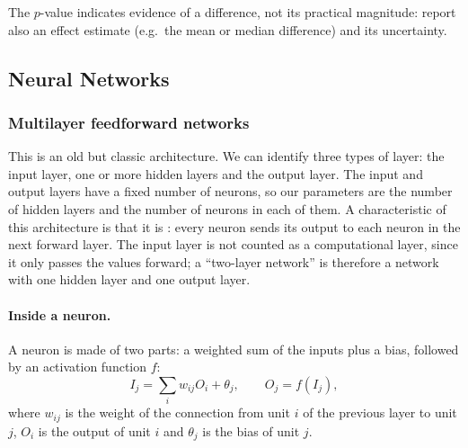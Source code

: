 \begin{remark}
The $p$-value indicates evidence of a difference, not its practical magnitude: report also an effect estimate (e.g.\ the mean or median difference) and its uncertainty.
\end{remark}

\subsection{Neural Networks}

\subsubsection{Multilayer feedforward networks}

This is an old but classic architecture. We can identify three types of layer: the input layer, one or more hidden layers and the output layer. The input and output layers have a fixed number of neurons, so our parameters are the number of hidden layers and the number of neurons in each of them. A characteristic of this architecture is that it is : every neuron sends its output to each neuron in the next forward layer. The input layer is not counted as a computational layer, since it only passes the values forward; a ``two-layer network'' is therefore a network with one hidden layer and one output layer.

\paragraph{Inside a neuron.} A neuron is made of two parts: a weighted sum of the inputs plus a bias, followed by an activation function $f$:
\[
  I_j = \sum_i w_{ij} O_i + \theta_j, \qquad O_j = f(I_j),
\]
where $w_{ij}$ is the weight of the connection from unit $i$ of the previous layer to unit $j$, $O_i$ is the output of unit $i$ and $\theta_j$ is the bias of unit $j$.

\begin{center}
\end{center}

